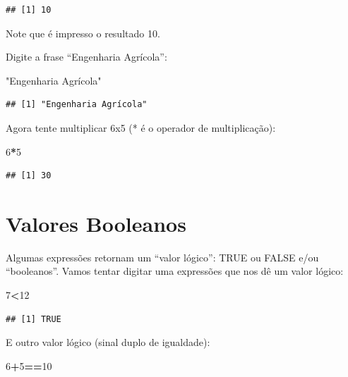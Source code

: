 \documentclass[
]{book}
\newenvironment{Shaded}{\begin{snugshade}}{\end{snugshade}}
\newcommand{\DecValTok}[1]{\textcolor[rgb]{0.00,0.00,0.81}{#1}}
\newcommand{\OperatorTok}[1]{\textcolor[rgb]{0.81,0.36,0.00}{\textbf{#1}}}
\newcommand{\StringTok}[1]{\textcolor[rgb]{0.31,0.60,0.02}{#1}}
\begin{document}
\begin{verbatim}
## [1] 10
\end{verbatim}

Note que é impresso o resultado 10.

Digite a frase ``Engenharia Agrícola'':

\begin{Shaded}
\begin{Highlighting}[]
\StringTok{"Engenharia Agrícola"}
\end{Highlighting}
\end{Shaded}

\begin{verbatim}
## [1] "Engenharia Agrícola"
\end{verbatim}

Agora tente multiplicar 6x5 (* é o operador de multiplicação):

\begin{Shaded}
\begin{Highlighting}[]
\DecValTok{6}\OperatorTok{*}\DecValTok{5}
\end{Highlighting}
\end{Shaded}

\begin{verbatim}
## [1] 30
\end{verbatim}

\hypertarget{valores-booleanos}{%
\section{Valores Booleanos}\label{valores-booleanos}}

Algumas expressões retornam um ``valor lógico'': TRUE ou FALSE e/ou ``booleanos''.
Vamos tentar digitar uma expressões que nos dê um valor lógico:

\begin{Shaded}
\begin{Highlighting}[]
\DecValTok{7}\OperatorTok{<}\DecValTok{12}
\end{Highlighting}
\end{Shaded}

\begin{verbatim}
## [1] TRUE
\end{verbatim}

E outro valor lógico (sinal duplo de igualdade):

\begin{Shaded}
\begin{Highlighting}[]
\DecValTok{6}\OperatorTok{+}\DecValTok{5}\OperatorTok{==}\DecValTok{10}
\end{Highlighting}
\end{Shaded}
\end{document}

